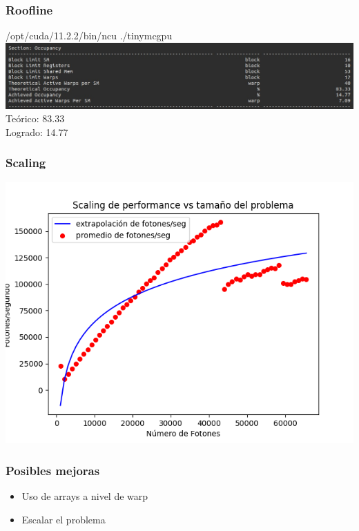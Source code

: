 \documentclass{beamer}
\begin{document}
\begin{frame}
	\frametitle{Roofline}
	/opt/cuda/11.2.2/bin/ncu ./tinymcgpu	
	\includegraphics[width=\textwidth]{imagenes/roofline.jpeg}\\
	Teórico: 83.33\\
	Logrado: 14.77
\end{frame}

\begin{frame}
    \frametitle{Scaling}
    \includegraphics[width=\textwidth]{imagenes/scaling_gpu.png}
\end{frame}

\begin{frame}
    \frametitle{Posibles mejoras}
    \begin{itemize}
        \item Uso de arrays a nivel de warp
        \item Escalar el problema
    \end{itemize}
\end{frame}
\end{document}
